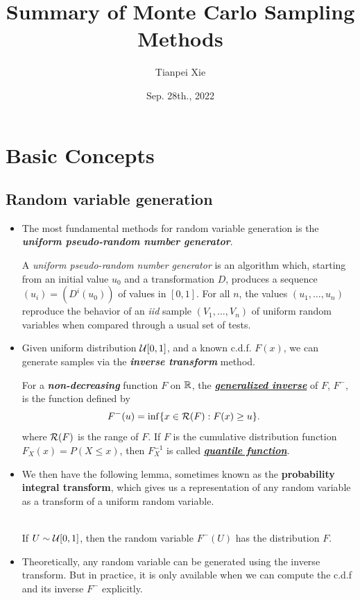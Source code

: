 \documentclass[11pt]{article}
\begin{document}
\title{Summary of Monte Carlo Sampling Methods}
\author{Tianpei Xie}
\date{Sep. 28th., 2022 }
\maketitle
\tableofcontents
\newpage
\allowdisplaybreaks
\section{Basic Concepts}
\subsection{Random variable generation}
\begin{itemize}
\item The most fundamental methods for random variable generation is the \emph{\textbf{uniform pseudo-random number generator}}.
\begin{definition}
 A \emph{uniform pseudo-random number generator} is an algorithm which, starting from an initial value $u_0$ and a transformation $D$, produces a sequence $(u_i) = (D^i(u_{0}))$ of values in $[0, 1]$. For all $n$, the values $(u_1, \ldots , u_n)$ reproduce the behavior of an \emph{iid} sample $(V_1, \ldots, V_n)$ of uniform random variables when compared through a usual set of tests.
 \end{definition}

\item Given uniform distribution ${\mathcal U}[0,1]$, and a known c.d.f. $F(x)$, we can generate samples via the \emph{\textbf{inverse transform}} method. \citep{robert1999monte}

\begin{definition}
For a \textbf{\emph{non-decreasing}} function $F$ on ${\mathbb R}$, the \underline{\emph{\textbf{generalized inverse}}} of $F$, $F^{-}$, is the function defined by
\begin{align}
F^{-}(u) &= \inf\{x \in {\mathcal R}(F): F(x) \ge u \}. \label{eqn: quantile_function}
\end{align} where ${\mathcal R}(F)$ is the range of $F$. If $F$ is the cumulative distribution function $F_{X}(x) = P(X \le x)$, then $F_{X}^{-1}$ is called \underline{\textbf{\emph{quantile function}}}.
\end{definition}

\item We then have the following lemma, sometimes known as the \textbf{probability integral transform}, which gives us a representation of any random variable as a transform of a uniform random variable.
\begin{lemma} \citep{robert1999monte}\\
If $U \sim {\mathcal U}[0,1]$, then the random variable $F^{-}(U)$ has the distribution $F$.
\end{lemma}

\item Theoretically, any random variable can be generated using the inverse transform. But in practice, it is only available when we can compute the c.d.f and its inverse $F^{-}$ explicitly. 
\end{itemize}
\end{document}
